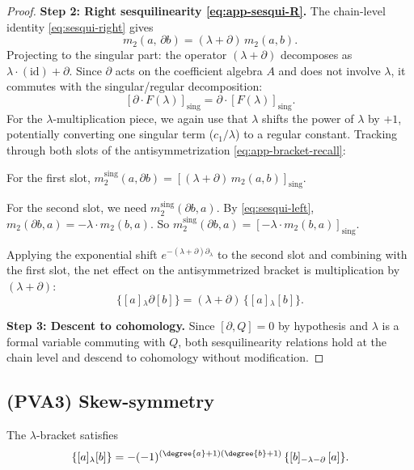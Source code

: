 \begin{proof}
\textbf{Step 2: Right sesquilinearity \eqref{eq:app-sesqui-R}.}
The chain-level identity \eqref{eq:sesqui-right} gives
\[
m_2(a,\, \partial b) = (\lambda + \partial)\,m_2(a,b).
\]
Projecting to the singular part: the operator $(\lambda + \partial)$ decomposes as $\lambda \cdot (\text{id}) + \partial$. Since $\partial$ acts on the coefficient algebra $A$ and does not involve $\lambda$, it commutes with the singular/regular decomposition:
\[
[\partial \cdot F(\lambda)]_{\mathrm{sing}} = \partial \cdot [F(\lambda)]_{\mathrm{sing}}.
\]
For the $\lambda$-multiplication piece, we again use that $\lambda$ shifts the power of $\lambda$ by $+1$, potentially converting one singular term ($c_1/\lambda$) to a regular constant. Tracking through both slots of the antisymmetrization \eqref{eq:app-bracket-recall}:

For the first slot, $m_2^{\mathrm{sing}}(a, \partial b) = [(\lambda + \partial)\,m_2(a,b)]_{\mathrm{sing}}$.

For the second slot, we need $m_2^{\mathrm{sing}}(\partial b, a)$. By \eqref{eq:sesqui-left}, $m_2(\partial b, a) = -\lambda \cdot m_2(b,a)$. So $m_2^{\mathrm{sing}}(\partial b, a) = [-\lambda \cdot m_2(b,a)]_{\mathrm{sing}}$.

Applying the exponential shift $e^{-(\lambda+\partial)\partial_\lambda}$ to the second slot and combining with the first slot, the net effect on the antisymmetrized bracket is multiplication by $(\lambda + \partial)$:
\[
\{[a]{}_\lambda \partial [b]\} = (\lambda + \partial)\,\{[a]{}_\lambda [b]\}.
\]

\textbf{Step 3: Descent to cohomology.}
Since $[\partial, Q] = 0$ by hypothesis and $\lambda$ is a formal variable commuting with $Q$, both sesquilinearity relations hold at the chain level and descend to cohomology without modification.
\end{proof}

\subsection{(PVA3) Skew-symmetry}

\begin{proposition}
\label{prop:app-skew}
The $\lambda$-bracket satisfies
\begin{equation}
\label{eq:app-skew}
\{[a]{}_\lambda [b]\} = -(-1)^{(\degree{a}+1)(\degree{b}+1)}\,\{[b]{}_{-\lambda-\partial}\,[a]\}.
\end{equation}
\end{proposition}

